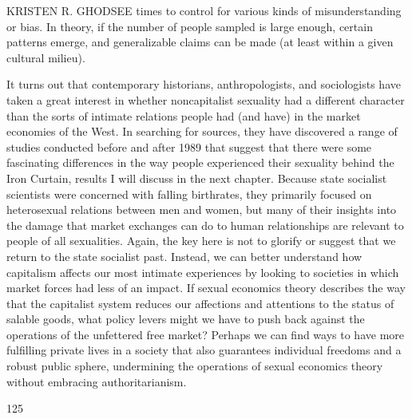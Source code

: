  \par 
KRISTEN R. GHODSEE times to control for various kinds of misunderstanding or bias. In theory, if the number of people sampled is large enough, certain patterns emerge, and generalizable claims can be made (at least within a given cultural milieu).
 \par 
It turns out that contemporary historians, anthropologists, and sociologists have taken a great interest in whether noncapitalist sexuality had a different character than the sorts of intimate relations people had (and have) in the market economies of the West. In searching for sources, they have discovered a range of studies conducted before and after 1989 that suggest that there were some fascinating differences in the way people experienced their sexuality behind the Iron Curtain, results I will discuss in the next chapter. Because state socialist scientists were concerned with falling birthrates, they primarily focused on heterosexual relations between men and women, but many of their insights into the damage that market exchanges can do to human relationships are relevant to people of all sexualities. Again, the key here is not to glorify or suggest that we return to the state socialist past. Instead, we can better understand how capitalism affects our most intimate experiences by looking to societies in which market forces had less of an impact. If sexual economics theory describes the way that the capitalist system reduces our affections and attentions to the status of salable goods, what policy levers might we have to push back against the operations of the unfettered free market? Perhaps we can find ways to have more fulfilling private lives in a society that also guarantees individual freedoms and a robust public sphere, undermining the operations of sexual economics theory without embracing authoritarianism.
 \par 
125
 \par 
